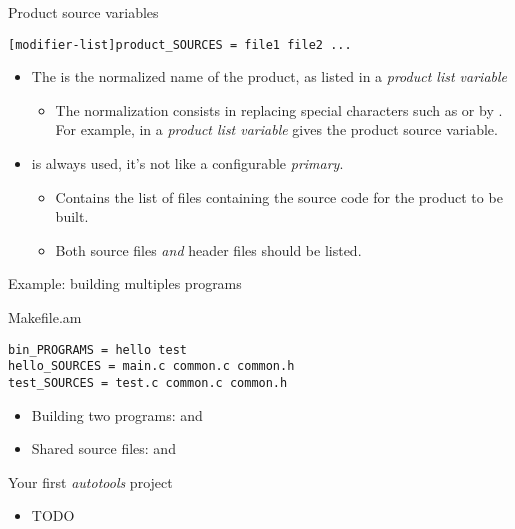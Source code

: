\begin{frame}[fragile]{Product source variables}

    \begin{block}{}
{\small
\begin{verbatim}
[modifier-list]product_SOURCES = file1 file2 ...
\end{verbatim}}
\end{block}

\begin{itemize}

\item The  is the normalized name of the product, as
  listed in a {\em product list variable}
  \begin{itemize}
  \item The normalization consists in replacing special characters
    such as  or \code{+} by \code{_}. For example,
     in a {\em product list variable} gives the
     product source variable.
  \end{itemize}
\item {} is always used, it's not like a configurable {\em
    primary}.
  \begin{itemize}
  \item Contains the list of files containing the source code for the
    product to be built.
  \item Both source files {\em and} header files should be listed.
  \end{itemize}
\end{itemize}

\end{frame}

\begin{frame}[fragile]{Example: building multiples programs}
  \begin{block}{Makefile.am}
    {\small
\begin{verbatim}
bin_PROGRAMS = hello test
hello_SOURCES = main.c common.c common.h
test_SOURCES = test.c common.c common.h
\end{verbatim}}
  \end{block}
  \begin{itemize}
  \item Building two programs:  and 
  \item Shared source files:  and 
  \end{itemize}
\end{frame}

\setuplabframe
{Your first {\em autotools} project}
{
  \begin{itemize}
  \item TODO
  \end{itemize}
}
